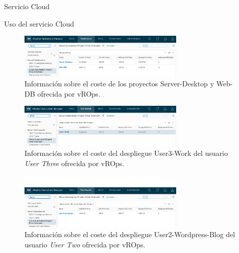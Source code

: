 \begin{subsection}{Servicio Cloud}
\begin{subsubsection}{Uso del servicio Cloud}
        \begin{figure}[h]
            \centering
            \includegraphics[width=0.7\textwidth]{imaxes/pruebaconcepto/vrealize/vrops-projects-price.png}
            \caption{Información sobre el coste de los proyectos Server-Desktop y Web-DB ofrecida por vROps.}
            \label{fig:vrops-cost-projects}
        \end{figure}
        \FloatBarrier
        \begin{figure}[h]
            \centering
            \includegraphics[width=0.7\textwidth]{imaxes/pruebaconcepto/vrealize/vrops-user3-price.png}
            \caption{Información sobre el coste del despliegue User3-Work del usuario \textit{User Three} ofrecida por vROps.}
            \label{fig:vrops-cost-user3}
        \end{figure}
        \FloatBarrier
        \begin{figure}[h]
            \centering
            \includegraphics[width=0.7\textwidth]{imaxes/pruebaconcepto/vrealize/vrops-user2-price.png}
            \caption{Información sobre el coste del despliegue User2-Wordpress-Blog del usuario \textit{User Two} ofrecida por vROps.}
            \label{fig:vrops-cost-user2}
        \end{figure}
        \FloatBarrier
        \begin{figure}[h]
            \centering

\end{figure}
\end{subsubsection}
\end{subsection}

